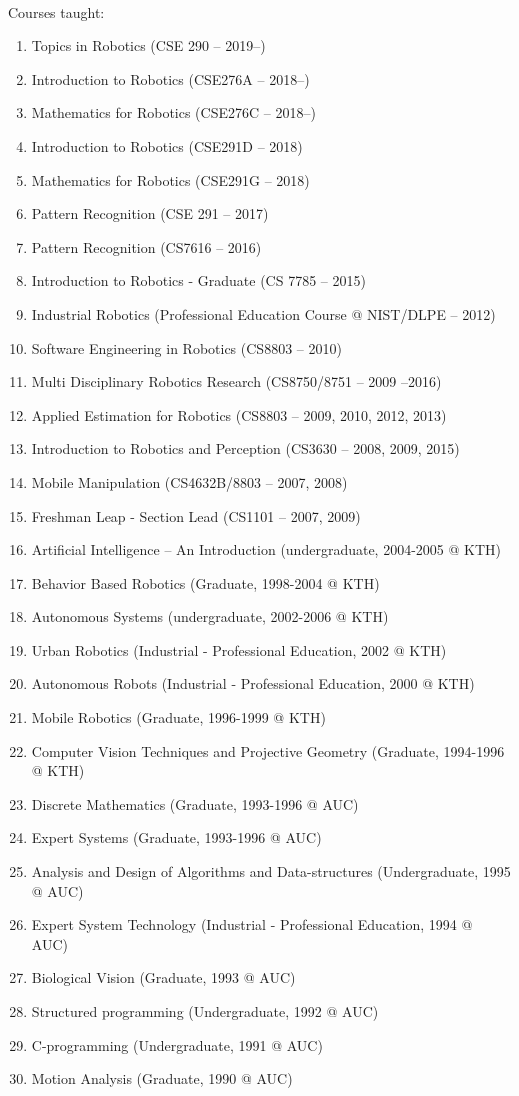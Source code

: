 \documentclass{article}
\begin{document}
\begin{cv}
\begin{cvlist}{~}
\item[Courses taught:]
  \begin{enumerate}
  \item Topics in Robotics (CSE 290 -- 2019--)
  \item Introduction to Robotics (CSE276A -- 2018--)
  \item Mathematics for Robotics (CSE276C -- 2018--)
  \item Introduction to Robotics (CSE291D -- 2018)
  \item Mathematics for Robotics (CSE291G -- 2018)
  \item Pattern Recognition (CSE 291 -- 2017)
  \item Pattern Recognition (CS7616 -- 2016)
  \item Introduction to Robotics - Graduate (CS 7785 -- 2015)
  \item Industrial Robotics (Professional Education Course @ NIST/DLPE
          -- 2012)
  \item Software Engineering in Robotics (CS8803 -- 2010)
  \item Multi Disciplinary Robotics Research (CS8750/8751 -- 2009 --2016)
  \item Applied Estimation for Robotics (CS8803 -- 2009, 2010, 2012, 2013)
  \item Introduction to Robotics and Perception (CS3630 -- 2008, 2009, 2015)
  \item Mobile Manipulation (CS4632B/8803 -- 2007, 2008)
  \item Freshman Leap - Section Lead (CS1101 -- 2007, 2009)
  \item Artificial Intelligence -- An Introduction (undergraduate,
    2004-2005 @ KTH)
  \item Behavior Based Robotics (Graduate, 1998-2004 @ KTH)
  \item Autonomous Systems (undergraduate, 2002-2006 @ KTH)
  \item Urban Robotics (Industrial - Professional Education, 2002 @ KTH)
  \item Autonomous Robots (Industrial - Professional Education, 2000 @  KTH)
  \item Mobile Robotics (Graduate, 1996-1999 @ KTH)
  \item Computer Vision Techniques and Projective Geometry (Graduate,
    1994-1996 @ KTH)
  \item Discrete Mathematics (Graduate, 1993-1996 @ AUC)
  \item Expert Systems (Graduate, 1993-1996 @ AUC)
  \item Analysis and Design of Algorithms and Data-structures
    (Undergraduate, 1995 @ AUC)
  \item Expert System Technology (Industrial - Professional Education,
    1994 @ AUC)
  \item Biological Vision (Graduate, 1993 @ AUC)
  \item Structured programming (Undergraduate, 1992 @ AUC)
  \item C-programming (Undergraduate, 1991 @ AUC)
  \item Motion Analysis (Graduate, 1990 @ AUC)
 \end{enumerate}


\end{cvlist}
\end{cv}
\end{document}
